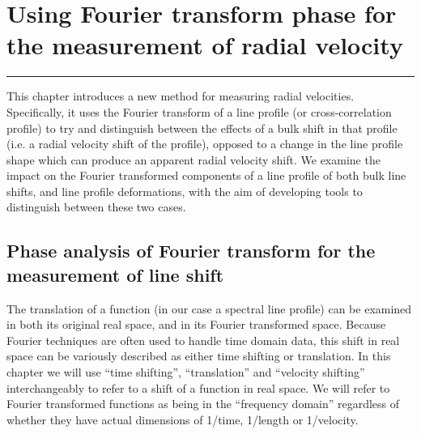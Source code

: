 \chapter{Using Fourier transform phase for the measurement of radial velocity}
\label{\thechapter}
\label{ch:Methods}


\rule{\textwidth}{1.6pt}
\minitoc
\clearpage



This chapter introduces a new method for measuring radial velocities. Specifically, it uses the Fourier transform
of a line profile (or cross-correlation profile) to try and distinguish between the effects of a bulk shift in that profile
(i.e. a radial velocity shift of the profile), opposed to a change in the line profile shape which can produce an
apparent radial velocity shift. We examine the impact on the Fourier transformed components of a line profile of both bulk line shifts, and line profile deformations, with the aim of developing tools to distinguish between these two cases.


\section{Phase analysis of Fourier transform for the measurement of line shift}
\label{\thesection}
\label{ch:FT_line_shift}

The translation of a function (in our case a spectral line profile) can be examined in both its original real
space, and in its Fourier transformed space. Because Fourier techniques are often used to handle time domain data,
this shift in real space can be variously described as either time shifting or translation. In this chapter 
we will use ``time shifting'', ``translation'' and ``velocity shifting'' interchangeably to refer to a shift of a function
in real space. We will refer to Fourier transformed functions as being in the ``frequency domain'' regardless of whether they have actual dimensions of 1/time, 1/length or 1/velocity.

